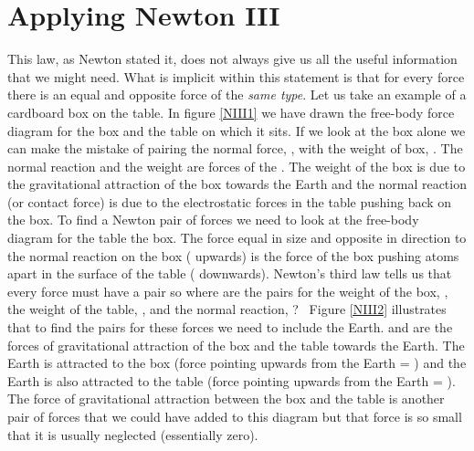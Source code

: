 \section{Applying Newton III}
This law, as Newton stated it, does not always give us all the useful information that we might need.  What is implicit within this statement is that for every force there is an equal and opposite force of the {\it same type}.  Let us take an example of a cardboard box on the table. \nl
In figure \ref{NIII1} we have drawn the free-body force diagram for the box and the table on which it sits.  If we look at the box alone we can make the mistake of pairing the normal force, ,  with the weight of box, .  The normal reaction and the weight are  forces of the . The weight of the box is due to the gravitational attraction of the box towards the Earth and the normal reaction (or contact force) is due to the electrostatic forces in the table pushing back on the box. To find a Newton pair of forces we need to look at the free-body diagram for the table  the box. The force equal in size and opposite in direction to the normal reaction on the box ( upwards) is the force of the box pushing atoms apart in the surface of the table ( downwards).\nl
Newton's third law tells us that every force must have a pair so where are the pairs for the weight of the box, , the weight of the table, , and the normal reaction, ? \  Figure \ref{NIII2} illustrates that to find the pairs for these forces we need to include the Earth.    and  are the forces of gravitational attraction of the box and the table towards the Earth.  The Earth is attracted to the box (force pointing upwards from the Earth = ) and the Earth is also attracted to the table (force pointing upwards from the Earth = ).\nl
The force of gravitational attraction between the box and the table is another pair of forces that we could have added to this diagram but that force is so small that it is usually neglected (essentially zero).

